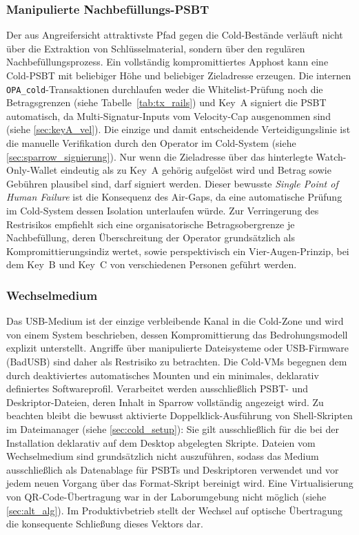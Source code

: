 \subsubsection{Manipulierte Nachbefüllungs-\ac{PSBT}}
Der aus Angreifersicht attraktivste Pfad gegen die Cold-Bestände verläuft nicht über die Extraktion von Schlüsselmaterial, sondern über den regulären Nachbefüllungsprozess.
Ein vollständig kompromittiertes Apphost kann eine Cold-\ac{PSBT} mit beliebiger Höhe und beliebiger Zieladresse erzeugen. Die internen \texttt{OPA\_cold}-Transaktionen durchlaufen weder die
Whitelist-Prüfung noch die Betragsgrenzen (siehe Tabelle~\ref{tab:tx_rails}) und Key~A signiert die \ac{PSBT} automatisch, da Multi-Signatur-Inputs vom Velocity-Cap ausgenommen sind (siehe \ref{sec:keyA_vel}). 
Die einzige und damit entscheidende Verteidigungslinie ist die manuelle Verifikation durch den Operator im Cold-System (siehe \ref{sec:sparrow_signierung}). Nur wenn die Zieladresse über das hinterlegte Watch-Only-Wallet eindeutig als zu Key~A gehörig aufgelöst wird und Betrag sowie Gebühren plausibel sind, darf signiert werden. 
Dieser bewusste \emph{Single Point of Human Failure} ist die Konsequenz des Air-Gaps, da eine automatische Prüfung im Cold-System dessen Isolation unterlaufen würde. 
Zur Verringerung des Restrisikos empfiehlt sich eine organisatorische Betragsobergrenze je Nachbefüllung, deren Überschreitung der Operator grundsätzlich als Kompromittierungsindiz wertet, sowie
perspektivisch ein Vier-Augen-Prinzip, bei dem Key~B und Key~C von verschiedenen Personen geführt werden.

\subsubsection{Wechselmedium}
Das \ac{USB}-Medium ist der einzige verbleibende Kanal in die Cold-Zone und wird von einem System beschrieben, dessen Kompromittierung das Bedrohungsmodell explizit unterstellt. Angriffe über manipulierte Dateisysteme oder \ac{USB}-Firmware (BadUSB) sind daher als Restrisiko zu betrachten. 
Die Cold-\acp{VM} begegnen dem durch deaktiviertes automatisches Mounten und ein minimales, deklarativ definiertes Softwareprofil. Verarbeitet werden ausschließlich \ac{PSBT}- und Deskriptor-Dateien, deren Inhalt in Sparrow vollständig angezeigt wird.
Zu beachten bleibt die bewusst aktivierte Doppelklick-Ausführung von Shell-Skripten im Dateimanager (siehe \ref{sec:cold_setup}): Sie gilt ausschließlich für die bei der Installation deklarativ auf dem Desktop abgelegten Skripte. 
Dateien vom Wechselmedium sind grundsätzlich nicht auszuführen, sodass das Medium ausschließlich als
Datenablage für \acp{PSBT} und Deskriptoren verwendet und vor jedem neuen Vorgang über das Format-Skript bereinigt wird. 
Eine Virtualisierung von \ac{QR}-Code-Übertragung war in der Laborumgebung nicht möglich (siehe
\ref{sec:alt_alg}). Im Produktivbetrieb stellt der Wechsel auf optische Übertragung die konsequente Schließung dieses Vektors dar.

